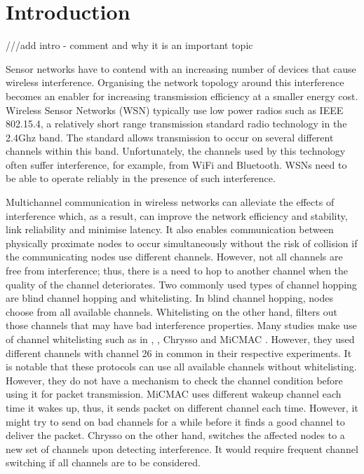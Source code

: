 \section{Introduction}
\label{sec:introduction}
///add intro - comment and why it is an important topic

Sensor networks have to contend with an increasing number of devices that cause wireless interference. Organising the network topology around this interference becomes an enabler for increasing transmission efficiency at a smaller energy cost. Wireless Sensor Networks (WSN) typically use low power radios such as IEEE 802.15.4, a relatively short range transmission standard radio technology in the 2.4Ghz band. The standard allows transmission to occur on several different channels within this band.  Unfortunately, the channels used by this technology often suffer interference, for example, from WiFi and Bluetooth. WSNs need to be able to operate reliably in the presence of such interference.  

Multichannel communication in wireless networks can alleviate the effects of interference which, as a result, can improve the network efficiency and stability, link reliability and minimise latency. It also enables communication between physically proximate nodes to occur simultaneously without the risk of collision if the communicating nodes use different channels. However, not all channels are free from interference; thus, there is a need to hop to another channel when the quality of the channel deteriorates. Two commonly used types of channel hopping \cite{watteyne} are blind channel hopping and whitelisting. In blind channel hopping, nodes choose from all available channels. Whitelisting on the other hand, filters out those channels that may have bad interference properties. Many studies make use of channel whitelisting such as in \cite{watteyne}, \cite{wu}, Chrysso \cite{chrysso} and MiCMAC \cite{micmac}. However, they used different channels with channel 26 in common in their respective experiments. 
It is notable that these protocols can use all available channels without whitelisting. However, they do not have a mechanism to check the channel condition before using it for packet transmission. %
MiCMAC uses different wakeup channel each time it wakes up, thus, it sends packet on different channel each time. However, it might try to send on bad channels for a while before it finds a good channel to deliver the packet. Chrysso on the other hand, switches the affected nodes to a new set of channels upon detecting interference. It would require frequent channel switching if all channels are to be considered.

